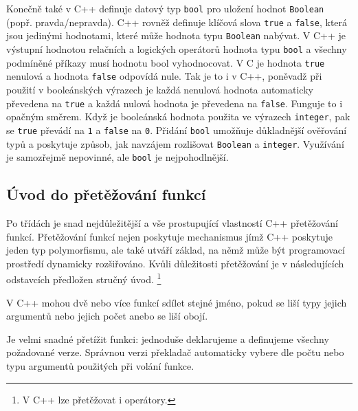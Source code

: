       Konečně také v C++ definuje datový typ \lstinline[style=luaCPPText]!bool! pro uložení hodnot
      \lstinline[style=luaCPPText]!Boolean! (popř. pravda/nepravda). C++ rovněž definuje klíčová
      slova \lstinline[style=luaCPPText]!true! a \lstinline[style=luaCPPText]!false!, která jsou
      jedinými hodnotami, které může hodnota typu \lstinline[style=luaCPPText]!Boolean! nabývat. V
      C++ je výstupní hodnotou relačních a logických operátorů hodnota typu
      \lstinline[style=luaCPPText]!bool! a všechny podmíněné příkazy musí hodnotu bool vyhodnocovat.
      V C je hodnota \lstinline[style=luaCPPText]!true! nenulová a hodnota
      \lstinline[style=luaCPPText]!false! odpovídá nule. Tak je to i v C++, poněvadž při použití v
      booleánských výrazech je každá nenulová hodnota automaticky převedena na
      \lstinline[style=luaCPPText]!true! a každá nulová hodnota je převedena na
      \lstinline[style=luaCPPText]!false!. Funguje to i opačným směrem. Když je booleánská hodnota
      použita ve výrazech \lstinline[style=luaCPPText]!integer!, pak se
      \lstinline[style=luaCPPText]!true! převádí na \lstinline[style=luaCPPText]!1! a
      \lstinline[style=luaCPPText]!false! na \lstinline[style=luaCPPText]!0!. Přidání
      \lstinline[style=luaCPPText]!bool! umožňuje důkladnější ověřování typů a poskytuje způsob, jak
      navzájem rozlišovat \lstinline[style=luaCPPText]!Boolean! a
      \lstinline[style=luaCPPText]!integer!. Využívání je samozřejmě nepovinné, ale
      \lstinline[style=luaCPPText]!bool! je nejpohodlnější.
  
    \subsection{Úvod do přetěžování funkcí}
      Po třídách je snad nejdůležitější a vše prostupující vlastností C++ přetě\-žování funkcí. 
      Přetěžování funkcí nejen poskytuje mechanismus jímž C++ poskytuje jeden typ polymorfismu, ale 
      také utváří základ, na němž může být programovací prostředí dynamicky rozšiřováno. Kvůli 
      důležitosti přetěžování je v následujících odstavcích předložen stručný úvod. \footnote{V C++ 
      lze přetěžovat i operátory.}
  
      V C++ mohou dvě nebo více funkcí sdílet stejné jméno, pokud se liší typy jejich argumentů 
      nebo jejich počet anebo se liší obojí.
  
      Je velmi snadné přetížit funkci: jednoduše deklarujeme a definujeme všechny požadované verze. 
      Správnou verzi překladač automaticky vybere dle počtu nebo typu argumentů použitých při 
      volání funkce.

